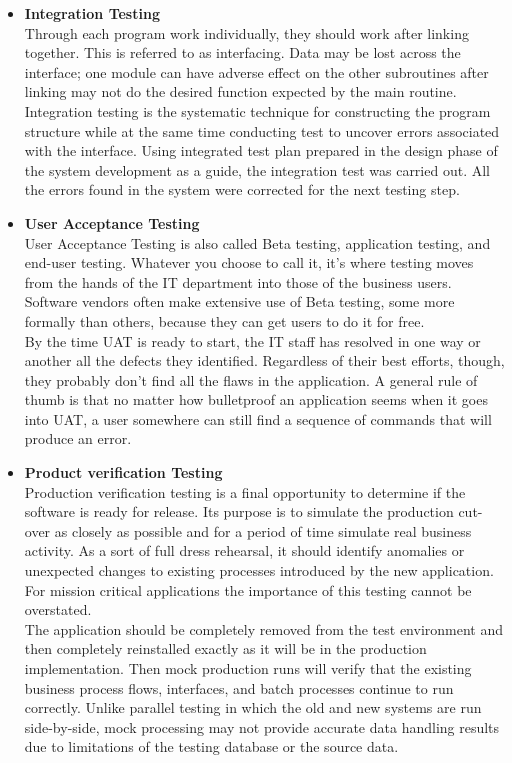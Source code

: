 \begin{itemize}
\item \textbf{Integration Testing}\\
Through each program work individually, they should work after linking together. This is referred to as interfacing. Data may be lost across the interface; one module can have adverse effect on the other subroutines after linking may not do the desired function expected by the main routine. Integration testing is the systematic technique for constructing the program structure while at the same time conducting test to uncover errors associated with the interface. Using integrated test plan prepared in the design phase of the system development as a guide, the integration test was carried out. All the errors found in the system were corrected for the next testing step.

\item \textbf{User Acceptance Testing}\\
User Acceptance Testing is also called Beta testing, application testing, and end-user testing. Whatever you choose
to call it, it’s where testing moves from the hands of the IT department into those of the business users. Software
vendors often make extensive use of Beta testing, some more formally than others, because they can get users to do
it for free. \\

\noindent
By the time UAT is ready to start, the IT staff has resolved in one way or another all the defects they identified.
Regardless of their best efforts, though, they probably don’t find all the flaws in the application. A general rule of
thumb is that no matter how bulletproof an application seems when it goes into UAT, a user somewhere can still find a
sequence of commands that will produce an error. \\
\item \textbf{Product verification Testing}\\
Production verification testing is a final opportunity to determine if the software is ready for release. Its purpose is to
simulate the production cut-over as closely as possible and for a period of time simulate real business activity. As a
sort of full dress rehearsal, it should identify anomalies or unexpected changes to existing processes introduced by
the new application. For mission critical applications the importance of this testing cannot be overstated.\\

\noindent
The application should be completely removed from the test environment and then completely reinstalled exactly as it
will be in the production implementation. Then mock production runs will verify that the existing business process
flows, interfaces, and batch processes continue to run correctly. Unlike parallel testing in which the old and new
systems are run side-by-side, mock processing may not provide accurate data handling results due to limitations of
the testing database or the source data. 


\end{itemize}
